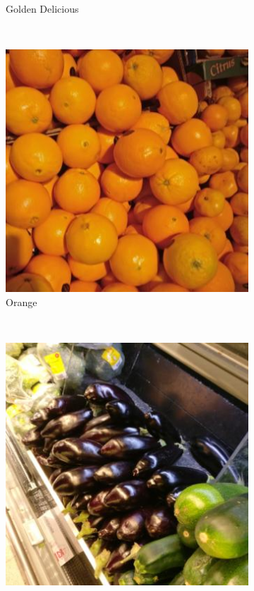 \begin{figure}[t]
\begin{minipage}[b]{0.47\textwidth}
\begin{subfigure}[t]{0.32\textwidth}
			\caption{Golden Delicious}
			\label{subfig:real-image-c}
		\end{subfigure}~
		\begin{subfigure}[t]{0.32\textwidth}
			\centering
			\includegraphics[width=\textwidth]{PaperA/dataset-figure/Orange_025.jpg}
			\caption{Orange}
			\label{subfig:real-image-f}
		\end{subfigure}~ \\[1mm]
		\begin{subfigure}[t]{0.32\textwidth}
			\centering
			\includegraphics[width=\textwidth]{PaperA/dataset-figure/Aubergine_016.jpg}

\end{subfigure}
\end{minipage}
\end{figure}
